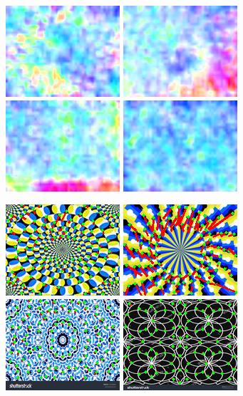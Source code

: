 \documentclass[journal]{IEEEtran}
\begin{document}
\begin{figure}
  \includegraphics[width=0.24\linewidth]{fig/rotate-0-flo.png}
  \includegraphics[width=0.24\linewidth]{fig/rotate-1-flo.png}
  \includegraphics[width=0.24\linewidth]{fig/control-0-flo.png}
  \includegraphics[width=0.24\linewidth]{fig/control-1-flo.png}

  \includegraphics[width=0.24\linewidth]{fig/lk-rotate-0.png}
  \includegraphics[width=0.24\linewidth]{fig/lk-rotate-1.png}
  \includegraphics[width=0.24\linewidth]{fig/lk-control-0.png}
  \includegraphics[width=0.24\linewidth]{fig/lk-control-1.png}


\end{figure}
\end{document}
